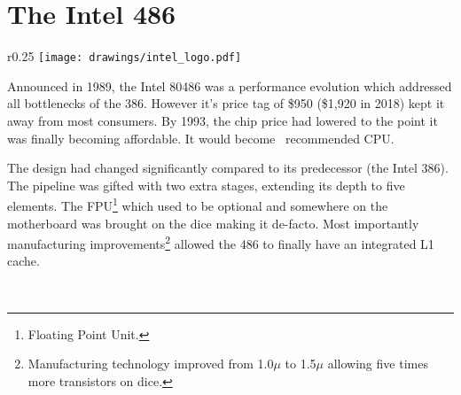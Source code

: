 \section{The Intel 486}

\begin{wrapfigure}[5]{r}{0.25\textwidth}
\centering
\texttt{[image: drawings/intel\_logo.pdf]}
\end{wrapfigure}

Announced in 1989, the Intel 80486 was a performance evolution which addressed all bottlenecks of the 386. However it's price tag of \$950 (\$1,920 in 2018) kept it away from most consumers. By 1993, the chip price had lowered to the point it was finally becoming affordable. It would become \doom~recommended CPU.\\
\par
The design had changed significantly compared to its predecessor (the Intel 386). The pipeline was gifted with two extra stages, extending its depth to five elements. The FPU\footnote{Floating Point Unit.} which used to be optional and somewhere on the motherboard was brought on the dice making it de-facto. Most importantly manufacturing improvements\footnote{Manufacturing technology improved from 1.0$\mu$ to 1.5$\mu$ allowing five times more transistors on dice.} allowed the 486 to finally have an integrated L1 cache.\\
\par
{}\\
\par

